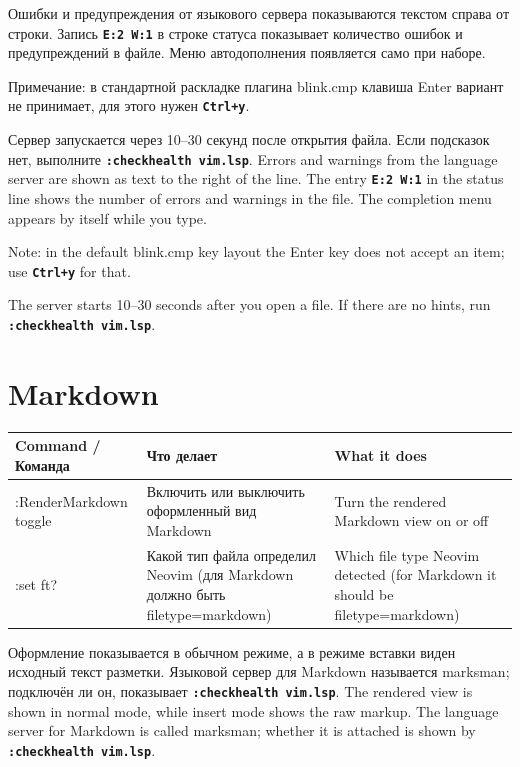\documentclass[10pt]{article}
\newcommand{\RU}{\selectlanguage{russian}}
\newcommand{\EN}{\selectlanguage{english}}
\newcommand{\key}[1]{\texttt{\bfseries #1}}
\newcommand{\hdr}[3]{\toprule \textbf{#1} & \textbf{#2} & \textbf{#3} \\ \midrule \endhead}
\begin{document}
\begin{paracol}{2}
\RU
Ошибки и предупреждения от языкового сервера показываются текстом справа от строки. Запись \key{E:2 W:1} в строке статуса показывает количество ошибок и предупреждений в файле. Меню автодополнения появляется само при наборе.

Примечание: в стандартной раскладке плагина blink.cmp клавиша Enter вариант не принимает, для этого нужен \key{Ctrl+y}.

Сервер запускается через 10--30 секунд после открытия файла. Если подсказок нет, выполните \key{:checkhealth vim.lsp}.
\switchcolumn
\EN
Errors and warnings from the language server are shown as text to the right of the line. The entry \key{E:2 W:1} in the status line shows the number of errors and warnings in the file. The completion menu appears by itself while you type.

Note: in the default blink.cmp key layout the Enter key does not accept an item; use \key{Ctrl+y} for that.

The server starts 10--30 seconds after you open a file. If there are no hints, run \key{:checkhealth vim.lsp}.
\end{paracol}

\section*{Markdown}
\begin{longtable}{@{}K A B@{}}
\hdr{Command / Команда}{Что делает}{What it does}
:RenderMarkdown toggle & Включить или выключить оформленный вид Markdown & Turn the rendered Markdown view on or off \\
:set ft? & Какой тип файла определил Neovim (для Markdown должно быть filetype=markdown) & Which file type Neovim detected (for Markdown it should be filetype=markdown) \\
\end{longtable}

\begin{paracol}{2}
\RU
Оформление показывается в обычном режиме, а в режиме вставки виден исходный текст разметки. Языковой сервер для Markdown называется marksman; подключён ли он, показывает \key{:checkhealth vim.lsp}.
\switchcolumn
\EN
The rendered view is shown in normal mode, while insert mode shows the raw markup. The language server for Markdown is called marksman; whether it is attached is shown by \key{:checkhealth vim.lsp}.
\end{paracol}
\end{document}
